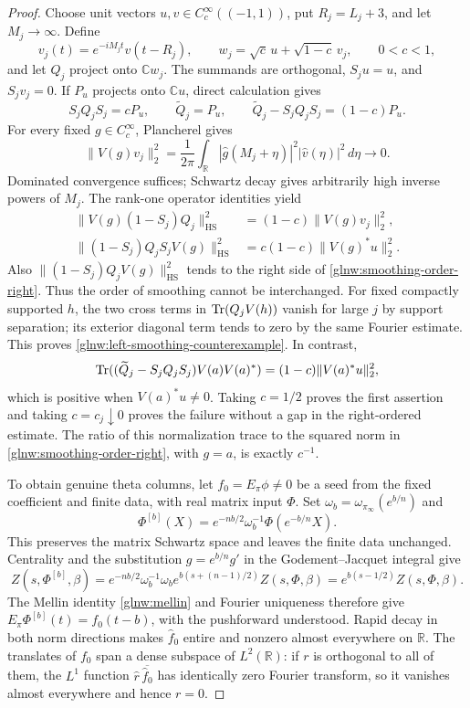 \begin{proof}
Choose unit vectors $u,v\in C_c^\infty((-1,1))$, put
$R_j=L_j+3$, and let $M_j\to\infty$. Define
\[
 v_j(t)=e^{-iM_jt}v(t-R_j),\qquad
 w_j=\sqrt c\,u+\sqrt{1-c}\,v_j,\qquad 0<c<1,
\]
and let $Q_j$ project onto $\mathbb Cw_j$. The summands are
orthogonal, $S_ju=u$, and $S_jv_j=0$. If $P_u$ projects onto
$\mathbb Cu$, direct calculation gives
\begin{equation}\label{glnw:rank-one-normalization}
 S_jQ_jS_j=cP_u,\qquad \widetilde Q_j=P_u,\qquad
 \widetilde Q_j-S_jQ_jS_j=(1-c)P_u.
\end{equation}
For every fixed $g\in C_c^\infty$, Plancherel gives
\[
 \|V(g)v_j\|_2^2
 =\frac1{2\pi}\int_{\mathbb R}
       |\widehat g(M_j+\eta)|^2|\widehat v(\eta)|^2\,d\eta\to0.
\]
Dominated convergence suffices; Schwartz decay gives arbitrarily
high inverse powers of $M_j$. The rank-one operator identities yield
\begin{align}
 \|V(g)(1-S_j)Q_j\|_{\mathrm{HS}}^2
   &=(1-c)\|V(g)v_j\|_2^2,\label{glnw:smoothing-order-left}\\
 \|(1-S_j)Q_jS_jV(g)\|_{\mathrm{HS}}^2
   &=c(1-c)\|V(g)^*u\|_2^2.\label{glnw:smoothing-order-right}
\end{align}
Also $\|(1-S_j)Q_jV(g)\|_{\mathrm{HS}}^2$ tends to the
right side of \eqref{glnw:smoothing-order-right}. Thus the
order of smoothing cannot be interchanged. For fixed compactly
supported $h$, the two cross terms in $\operatorname{Tr}(Q_jV(h))$ vanish
for large $j$ by support separation; its exterior diagonal term
tends to zero by the same Fourier estimate. This proves
\eqref{glnw:left-smoothing-counterexample}. In contrast,
\[
 \operatorname{Tr}((\widetilde Q_j-S_jQ_jS_j)V(a)V(a)^*)
       =(1-c)\|V(a)^*u\|_2^2,
\]
which is positive when $V(a)^*u\ne0$. Taking $c=1/2$ proves
the first assertion and taking $c=c_j\downarrow0$ proves the
failure without a gap in the right-ordered estimate. The ratio
of this normalization trace to the squared norm in
\eqref{glnw:smoothing-order-right}, with $g=a$, is exactly $c^{-1}$.

To obtain genuine theta columns, let $f_0=E_\pi\phi\ne0$ be a
seed from the fixed coefficient and finite data, with real matrix
input $\Phi$. Set $\omega_b=\omega_{\pi_\infty}(e^{b/n})$ and
\[
 \Phi^{[b]}(X)=e^{-nb/2}\omega_b^{-1}\Phi(e^{-b/n}X).
\]
This preserves the matrix Schwartz space and leaves the finite
data unchanged. Centrality and the substitution
$g=e^{b/n}g'$ in the Godement--Jacquet integral give
\[
 Z(s,\Phi^{[b]},\beta)
 =e^{-nb/2}\omega_b^{-1}\omega_b
       e^{b(s+(n-1)/2)}Z(s,\Phi,\beta)
 =e^{b(s-1/2)}Z(s,\Phi,\beta).
\]
The Mellin identity \eqref{glnw:mellin} and Fourier uniqueness
therefore give $E_\pi\Phi^{[b]}(t)=f_0(t-b)$, with the
pushforward understood. Rapid decay in both norm directions makes
$\widehat f_0$ entire and nonzero almost everywhere on $\mathbb R$.
The translates of $f_0$ span a dense subspace of $L^2(\mathbb R)$:
if $r$ is orthogonal to all of them, the $L^1$ function
$\widehat r\,\overline{\widehat f_0}$ has identically zero Fourier
transform, so it vanishes almost everywhere and hence $r=0$.


\end{proof}

